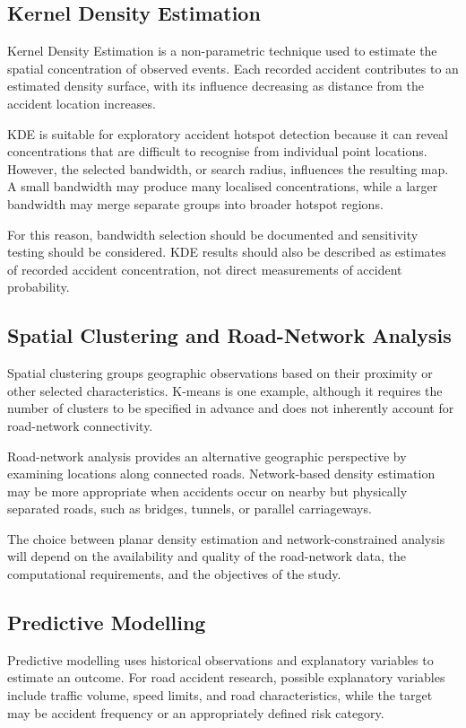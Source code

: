 \subsection{Kernel Density Estimation}
\label{subsec:lit-kde}
Kernel Density Estimation is a non-parametric technique used to estimate the spatial concentration of observed events. Each recorded accident contributes to an estimated density surface, with its influence decreasing as distance from the accident location increases.

KDE is suitable for exploratory accident hotspot detection because it can reveal concentrations that are difficult to recognise from individual point locations. However, the selected bandwidth, or search radius, influences the resulting map. A small bandwidth may produce many localised concentrations, while a larger bandwidth may merge separate groups into broader hotspot regions.

For this reason, bandwidth selection should be documented and sensitivity testing should be considered. KDE results should also be described as estimates of recorded accident concentration, not direct measurements of accident probability.

\subsection{Spatial Clustering and Road-Network Analysis}
\label{subsec:lit-spatialCluster}
Spatial clustering groups geographic observations based on their proximity or other selected characteristics. K-means is one example, although it requires the number of clusters to be specified in advance and does not inherently account for road-network connectivity.

Road-network analysis provides an alternative geographic perspective by examining locations along connected roads. Network-based density estimation may be more appropriate when accidents occur on nearby but physically separated roads, such as bridges, tunnels, or parallel carriageways.

The choice between planar density estimation and network-constrained analysis will depend on the availability and quality of the road-network data, the computational requirements, and the objectives of the study.

\subsection{Predictive Modelling}
\label{subsec:lit-predictiveModelling}
Predictive modelling uses historical observations and explanatory variables to estimate an outcome. For road accident research, possible explanatory variables include traffic volume, speed limits, and road characteristics, while the target may be accident frequency or an appropriately defined risk category.

